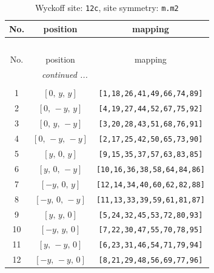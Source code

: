 \documentclass[fleqn,8pt]{jsarticle}
\begin{document}
\begin{longtable}{ccc}
\caption{Wyckoff site: {\tt 12c}, site symmetry: {\tt m.m2}}
 \\
 \hline \hline
No. & position & mapping \\ \hline \endfirsthead

\multicolumn{2}{l}{\tablename\ \thetable{}} \\
 \hline \hline
No. & position & mapping \\ \hline \endhead

 \hline \hline
\multicolumn{2}{r}{\footnotesize\it continued ...} \\ \endfoot

 \hline \hline
\multicolumn{2}{r}{} \\ \endlastfoot

1 & $\left[ 0,\, y,\, y \right]$ & {\tt [1,18,26,41,49,66,74,89]} \\ \hline
2 & $\left[ 0,\, - y,\, y \right]$ & {\tt [4,19,27,44,52,67,75,92]} \\ \hline
3 & $\left[ 0,\, y,\, - y \right]$ & {\tt [3,20,28,43,51,68,76,91]} \\ \hline
4 & $\left[ 0,\, - y,\, - y \right]$ & {\tt [2,17,25,42,50,65,73,90]} \\ \hline
5 & $\left[ y,\, 0,\, y \right]$ & {\tt [9,15,35,37,57,63,83,85]} \\ \hline
6 & $\left[ y,\, 0,\, - y \right]$ & {\tt [10,16,36,38,58,64,84,86]} \\ \hline
7 & $\left[ - y,\, 0,\, y \right]$ & {\tt [12,14,34,40,60,62,82,88]} \\ \hline
8 & $\left[ - y,\, 0,\, - y \right]$ & {\tt [11,13,33,39,59,61,81,87]} \\ \hline
9 & $\left[ y,\, y,\, 0 \right]$ & {\tt [5,24,32,45,53,72,80,93]} \\ \hline
10 & $\left[ - y,\, y,\, 0 \right]$ & {\tt [7,22,30,47,55,70,78,95]} \\ \hline
11 & $\left[ y,\, - y,\, 0 \right]$ & {\tt [6,23,31,46,54,71,79,94]} \\ \hline
12 & $\left[ - y,\, - y,\, 0 \right]$ & {\tt [8,21,29,48,56,69,77,96]} \\
\end{longtable}
\renewcommand{\arraystretch}{1.2}
\end{document}
